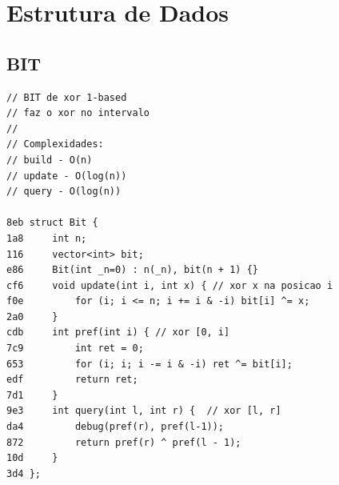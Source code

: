 \documentclass[11pt, a4paper, twoside]{article}
\begin{document}
%
%

\section{Estrutura de Dados}

\subsection{BIT}
\begin{lstlisting}
// BIT de xor 1-based
// faz o xor no intervalo
//
// Complexidades:
// build - O(n)
// update - O(log(n))
// query - O(log(n))
 
8eb struct Bit {
1a8 	int n;
116 	vector<int> bit;
e86 	Bit(int _n=0) : n(_n), bit(n + 1) {}
cf6 	void update(int i, int x) { // xor x na posicao i
f0e 		for (i; i <= n; i += i & -i) bit[i] ^= x;
2a0 	}
cdb 	int pref(int i) { // xor [0, i]
7c9 		int ret = 0;
653 		for (i; i; i -= i & -i) ret ^= bit[i];
edf 		return ret;
7d1 	}
9e3 	int query(int l, int r) {  // xor [l, r]
da4         debug(pref(r), pref(l-1));
872 		return pref(r) ^ pref(l - 1); 
10d 	}
3d4 };
\end{lstlisting}
\end{document}
